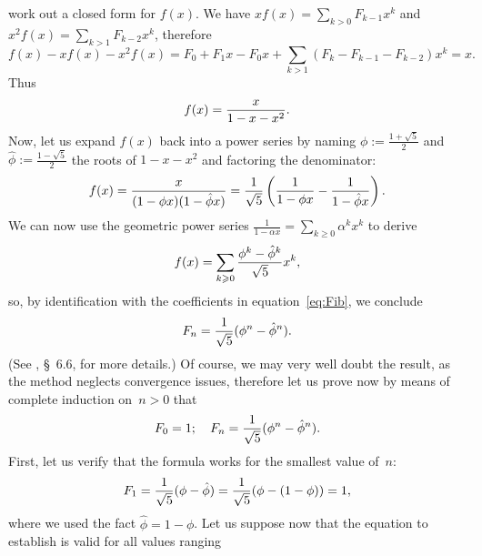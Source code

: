 work out a closed form for \(f(x)\). We have \(xf(x) = \sum_{k >
  0}{F_{k-1}x^k}\) and \(x^2f(x) = \sum_{k>1}{F_{k-2}x^k}\), therefore
\begin{equation*}
f(x) - xf(x) - x^2f(x) = F_0 + F_1x - F_0x
                         + \sum_{k>1}{(F_k - F_{k-1} - F_{k-2})x^k}
                       = x.
\end{equation*}
Thus
\begin{equation*}
\abovedisplayskip=0pt
\belowdisplayskip=2pt
f(x) = \frac{x}{1 - x - x^2}.
\end{equation*}
Now, let us expand \(f(x)\) back into a power series by naming \(\phi
:= \frac{1+\sqrt{5}}{2}\) and \(\hat\phi := \frac{1-\sqrt{5}}{2}\) the
roots of \(1 - x - x^2\) and factoring the denominator:
\begin{equation*}
\abovedisplayskip=4pt
\belowdisplayskip=4pt
f(x) = \frac{x}{(1-\phi x)(1-\hat\phi x)}
     = \frac{1}{\sqrt{5}}\left(\frac{1}{1 - \phi x}
                              - \frac{1}{1 - \hat\phi x}\right).
\end{equation*}
We can now use the geometric power series \(\frac{1}{1-\alpha x} =
\sum_{k \geqslant 0}{\alpha^kx^k}\) to derive
\begin{equation*}
\abovedisplayskip=4pt
\belowdisplayskip=4pt
f(x) = \sum_{k \geqslant 0}{\frac{\phi^k-\hat\phi^k}{\sqrt{5}}}x^k,
\end{equation*}
so, by identification with the coefficients in
equation~\eqref{eq:Fib}, we conclude
\begin{equation*}
\abovedisplayskip=4pt
\belowdisplayskip=4pt
F_n = \frac{1}{\sqrt{5}}(\phi^n - \hat\phi^n).
\end{equation*}
(See \cite{GrahamKnuthPatashnik_1994}, \S~6.6, for more details.)  Of
course, we may very well doubt the result, as the method neglects
convergence issues, therefore let us prove
now by means of complete induction on~\(n > 0\) that
\begin{equation*}
\abovedisplayskip=4pt
\belowdisplayskip=4pt
F_0 = 1;\quad F_n = \frac{1}{\sqrt{5}}(\phi^n - \hat\phi^n).
\end{equation*}
First, let us verify that the formula works for the smallest value of~\(n\):
\begin{equation*}
\abovedisplayskip=4pt
\belowdisplayskip=4pt
F_1 = \frac{1}{\sqrt{5}}(\phi - \hat\phi)
    = \frac{1}{\sqrt{5}}(\phi - (1 - \phi)) = 1,
\end{equation*}
where we used the fact \(\hat\phi = 1 - \phi\). Let us suppose now
that the equation to establish is valid for all values ranging
